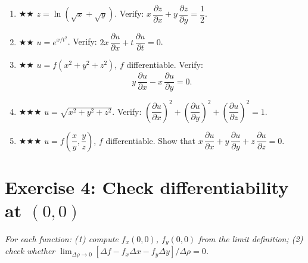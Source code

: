 \documentclass[12pt,a4paper]{article}
\newcommand{\medium}{{\color{orange}$\bigstar\bigstar$}}
\newcommand{\hard}{{\color{red}$\bigstar\bigstar\bigstar$}}
\begin{document}
\begin{enumerate}[leftmargin=*, label=(\alph*)]

\item \medium\quad
$z = \ln(\sqrt{x}+\sqrt{y})$.\quad
Verify: $x\,\dfrac{\partial z}{\partial x}+y\,\dfrac{\partial z}{\partial y}=\dfrac{1}{2}$.

\item \medium\quad
$u = e^{x/t^2}$.\quad
Verify: $2x\,\dfrac{\partial u}{\partial x}+t\,\dfrac{\partial u}{\partial t}=0$.

\item \medium\quad
$u = f(x^2+y^2+z^2)$, $f$ differentiable. Verify:
\[y\,\frac{\partial u}{\partial x}-x\,\frac{\partial u}{\partial y}=0.\]

\item \hard\quad
$u = \sqrt{x^2+y^2+z^2}$.\quad
Verify: $\left(\dfrac{\partial u}{\partial x}\right)^2+\left(\dfrac{\partial u}{\partial y}\right)^2+\left(\dfrac{\partial u}{\partial z}\right)^2 = 1$.

\item \hard\quad
$u = f\!\left(\dfrac{x}{y},\dfrac{y}{z}\right)$, $f$ differentiable. Show that
$x\,\dfrac{\partial u}{\partial x}+y\,\dfrac{\partial u}{\partial y}+z\,\dfrac{\partial u}{\partial z}=0$.

\end{enumerate}

\section*{Exercise 4: Check differentiability at $(0,0)$}

\emph{For each function: (1) compute $f_x(0,0)$, $f_y(0,0)$ from the limit definition;
(2) check whether $\lim_{\Delta\rho\to 0}[\Delta f - f_x\Delta x - f_y\Delta y]/\Delta\rho = 0$.}
\end{document}
